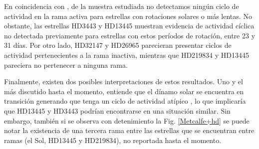 \documentclass[baaa]{baaa}
\begin{document}
En coincidencia con \cite{Metcalfe16}, de la muestra estudiada no detectamos ningún ciclo de actividad en la rama activa para estrellas con rotaciones solares o más lentas. No obstante, las estrellas HD3443 y HD13445 muestran evidencia de actividad cíclica no detectada previamente para estrellas con estos períodos de rotación, entre 23 y 31 días. Por otro lado,  HD32147 y HD26965 parecieran presentar ciclos de actividad pertenecientes a la rama inactiva, mientras que HD219834 y HD13445 pareciera no pertenecer a ninguna rama.

Finalmente, existen dos posibles interpretaciones de estos resultados. Uno y el más discutido hasta el momento, entiende que el dínamo solar se encuentra en transición generando que tenga un ciclo de actividad atípico \citep{Metcalfe16}, lo que implicaría que HD13445 y HD3443 podrían encontrarse en una situación similar. Sin embargo, también si se observa con detenimiento la Fig. \ref{Metcalfe+hd} se puede notar la existencia de una tercera rama entre las estrellas que se encuentran entre ramas (el Sol, HD13445 y HD219834), no reportada hasta el momento. 



\small

 
\end{document}
